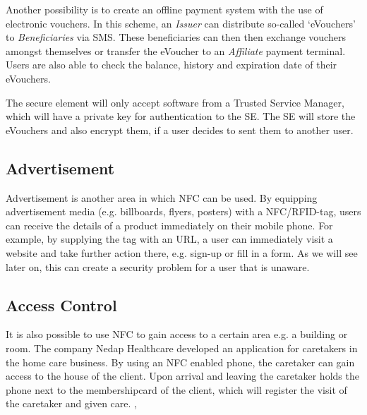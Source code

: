 Another possibility is to create an offline payment system with the use of electronic vouchers.
In this scheme, an \textit{Issuer} can distribute so-called `eVouchers' to \textit{Beneficiaries} via SMS.
These beneficiaries can then then exchange vouchers amongst themselves or transfer the eVoucher to an \textit{Affiliate} payment terminal.
Users are also able to check the balance, history and expiration date of their eVouchers. 

The secure element will only accept software from a Trusted Service Manager, which will have a private key for authentication to the SE.
The SE will store the eVouchers and also encrypt them, if a user decides to sent them to another user. \cite{1592613}


\subsection{Advertisement}
Advertisement is another area in which NFC can be used. By equipping advertisement media (e.g. billboards, flyers, posters) with a NFC/RFID-tag, users can receive the details of a product immediately on their mobile phone.
For example, by supplying the tag with an URL, a user can immediately visit a website and take further action there, e.g. sign-up or fill in a form.
As we will see later on, this can create a security problem for a user that is unaware. \cite{mulliner2009vulnerability}

\subsection{Access Control}
It is also possible to use NFC to gain access to a certain area e.g. a building or room. The company Nedap Healthcare developed an application for caretakers in the home care business. By using an NFC enabled phone, the caretaker can gain access to the house of the client. Upon arrival and leaving the caretaker holds the phone next to the membershipcard of the client, which will register the visit of the caretaker and given care. \cite{Nedap1}, \cite{Nedap2}

